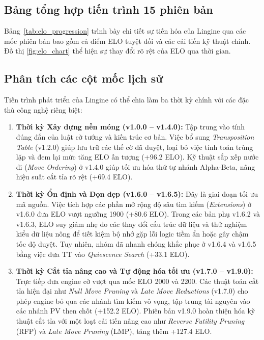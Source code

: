 \subsection{Bảng tổng hợp tiến trình 15 phiên bản}

Bảng~\ref{tab:elo_progression} trình bày chi tiết sự tiến hóa của Lingine qua các mốc phiên bản bao gồm cả điểm ELO tuyệt đối và các cải tiến kỹ thuật chính. Đồ thị \ref{fig:elo_chart} thể hiện sự thay đổi rõ rệt của ELO qua thời gian.


\subsection{Phân tích các cột mốc lịch sử}

Tiến trình phát triển của Lingine có thể chia làm ba thời kỳ chính với các đặc thù công nghệ riêng biệt:
\begin{enumerate}
    \item \textbf{Thời kỳ Xây dựng nền móng (v1.0.0 -- v1.4.0):} Tập trung vào tính đúng đắn của luật cờ tướng và kiến trúc cơ bản. Việc bổ sung \textit{Transposition Table} (v1.2.0) giúp lưu trữ các thế cờ đã duyệt, loại bỏ việc tính toán trùng lặp và đem lại mức tăng ELO ấn tượng (+96.2 ELO). Kỹ thuật sắp xếp nước đi (\textit{Move Ordering}) ở v1.4.0 giúp tối ưu hóa thứ tự nhánh Alpha-Beta, nâng hiệu suất cắt tỉa rõ rệt (+69.4 ELO).
    \item \textbf{Thời kỳ Ổn định và Dọn dẹp (v1.6.0 -- v1.6.5):} Đây là giai đoạn tối ưu mã nguồn. Việc tích hợp các phần mở rộng độ sâu tìm kiếm (\textit{Extensions}) ở v1.6.0 đưa ELO vượt ngưỡng 1900 (+80.6 ELO). Trong các bản phụ v1.6.2 và v1.6.3, ELO suy giảm nhẹ do các thay đổi cấu trúc dữ liệu và thử nghiệm kiểu dữ liệu nông để tiết kiệm bộ nhớ gặp lỗi logic tiềm ẩn hoặc gây chậm tốc độ duyệt. Tuy nhiên, nhóm đã nhanh chóng khắc phục ở v1.6.4 và v1.6.5 bằng việc đưa TT vào \textit{Quiescence Search} (+33.1 ELO).
    \item \textbf{Thời kỳ Cắt tỉa nâng cao và Tự động hóa tối ưu (v1.7.0 -- v1.9.0):} Trực tiếp đưa engine cờ vượt qua mốc ELO 2000 và 2200. Các thuật toán cắt tỉa hiện đại như \textit{Null Move Pruning} và \textit{Late Move Reductions} (v1.7.0) cho phép engine bỏ qua các nhánh tìm kiếm vô vọng, tập trung tài nguyên vào các nhánh PV then chốt (+152.2 ELO). Phiên bản v1.9.0 hoàn thiện hóa kỹ thuật cắt tỉa với một loạt cải tiến nâng cao như \textit{Reverse Futility Pruning} (RFP) và \textit{Late Move Pruning} (LMP), tăng thêm +127.4 ELO.
\end{enumerate}


